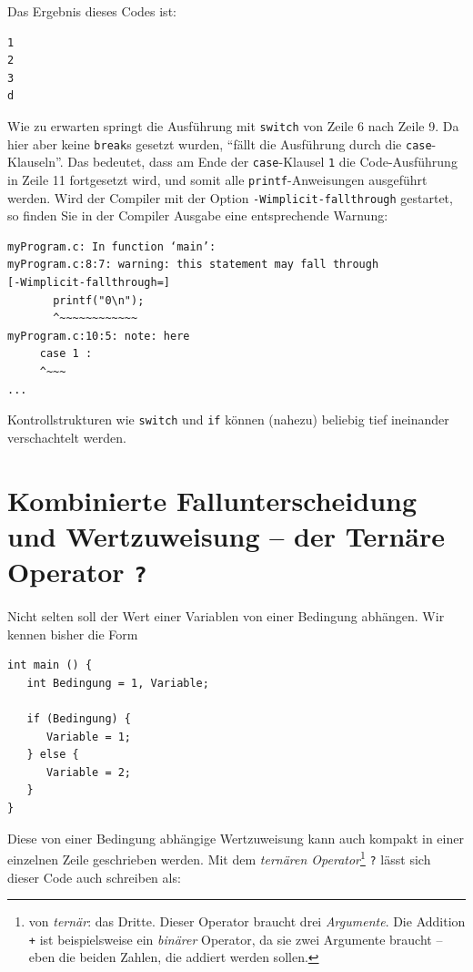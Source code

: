 Das Ergebnis dieses Codes ist:
\begin{cmdbox}
\begin{verbatim}
1
2
3
d
\end{verbatim}
\end{cmdbox}

Wie zu erwarten springt die Ausführung mit \texttt{switch} von Zeile 6 nach Zeile 9. Da hier aber keine \texttt{break}s gesetzt wurden, \enquote{fällt die Ausführung durch die \texttt{case}-Klauseln}. Das bedeutet, dass am Ende der \texttt{case}-Klausel \texttt{1} die Code-Ausführung in Zeile 11 fortgesetzt wird, und somit alle \texttt{printf}-Anweisungen ausgeführt werden. Wird der Compiler mit der Option \texttt{-Wimplicit-fallthrough} gestartet, so finden Sie in der Compiler Ausgabe eine entsprechende Warnung:

\begin{cmdbox}
\begin{verbatim}
myProgram.c: In function ‘main’:
myProgram.c:8:7: warning: this statement may fall through
[-Wimplicit-fallthrough=]
       printf("0\n");
       ^~~~~~~~~~~~~
myProgram.c:10:5: note: here
     case 1 :
     ^~~~
...
\end{verbatim}
\end{cmdbox}

Kontrollstrukturen wie \texttt{switch} und \texttt{if} können (nahezu) beliebig tief ineinander verschachtelt werden.

\section{Kombinierte Fallunterscheidung und Wertzuweisung -- der Ternäre Operator \texttt{?}}
Nicht selten soll der Wert einer Variablen von einer Bedingung abhängen. Wir kennen bisher die Form

\begin{codebox}
\begin{verbatim}
int main () {
   int Bedingung = 1, Variable;

   if (Bedingung) {
      Variable = 1;
   } else {
      Variable = 2;
   }
}
\end{verbatim}
\end{codebox}

Diese von einer Bedingung abhängige Wertzuweisung kann auch kompakt in einer einzelnen Zeile geschrieben werden. Mit dem \emph{ternären Operator}\footnote{von \emph{ternär}: das Dritte. Dieser Operator braucht drei \emph{Argumente}. Die Addition \texttt{+} ist beispielsweise ein \emph{binärer} Operator, da sie zwei Argumente braucht -- eben die beiden Zahlen, die addiert werden sollen.} \texttt{?} lässt sich dieser Code auch schreiben als:

